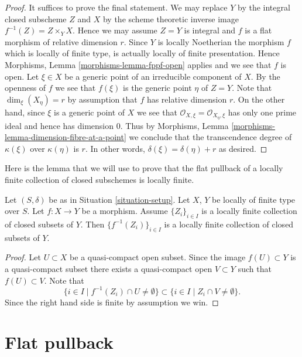 \begin{proof}
It suffices to prove the final statement.
We may replace $Y$ by the integral closed subscheme $Z$ and
$X$ by the scheme theoretic inverse image $f^{-1}(Z) = Z \times_Y X$.
Hence we may assume $Z = Y$ is integral and $f$ is a flat morphism
of relative dimension $r$. Since $Y$ is locally Noetherian the
morphism $f$ which is locally of finite type,
is actually locally of finite presentation. Hence
Morphisms, Lemma \ref{morphisms-lemma-fppf-open}
applies and we see that $f$ is open.
Let $\xi \in X$ be a generic point of an irreducible component
of $X$. By the openness of $f$ we see that $f(\xi)$ is the
generic point $\eta$ of $Z = Y$. Note that $\dim_\xi(X_\eta) = r$
by assumption that $f$ has relative dimension $r$. On the other
hand, since $\xi$ is a generic point of $X$ we see that
$\mathcal{O}_{X, \xi} = \mathcal{O}_{X_\eta, \xi}$ has only one
prime ideal and hence has dimension $0$. Thus by
Morphisms, Lemma \ref{morphisms-lemma-dimension-fibre-at-a-point}
we conclude that the transcendence
degree of $\kappa(\xi)$ over $\kappa(\eta)$ is $r$.
In other words, $\delta(\xi) = \delta(\eta) + r$ as desired.
\end{proof}

\noindent
Here is the lemma that we will use to prove that the flat pullback
of a locally finite collection of closed subschemes is locally finite.

\begin{lemma}
\label{lemma-inverse-image-locally-finite}
Let $(S, \delta)$ be as in Situation \ref{situation-setup}.
Let $X$, $Y$ be locally of finite type over $S$.
Let $f : X \to Y$ be a morphism.
Assume $\{Z_i\}_{i \in I}$ is a locally
finite collection of closed subsets of $Y$.
Then $\{f^{-1}(Z_i)\}_{i \in I}$ is a locally finite
collection of closed subsets of $Y$.
\end{lemma}

\begin{proof}
Let $U \subset X$ be a quasi-compact open subset.
Since the image $f(U) \subset Y$ is a quasi-compact subset
there exists a quasi-compact open $V \subset Y$ such that
$f(U) \subset V$. Note that
$$
\{i \in I \mid f^{-1}(Z_i) \cap U \not = \emptyset \}
\subset
\{i \in I \mid Z_i \cap V \not = \emptyset \}.
$$
Since the right hand side is finite by assumption we win.
\end{proof}



\section{Flat pullback}
\label{section-flat-pullback}

